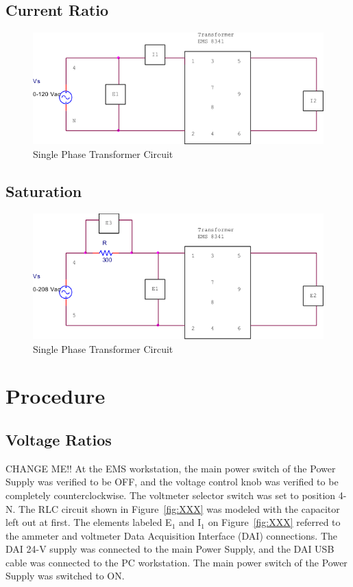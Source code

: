\documentclass{article}
\begin{document}
\subsection{Current Ratio}
\begin{figure}[H]
  \centering
  \includegraphics[width=.8\textwidth]{img/circuit_02}
  \caption{Single Phase Transformer Circuit}
  \label{fig:circuit_02}
\end{figure}

\subsection{Saturation}
\begin{figure}[H]
  \centering
  \includegraphics[width=.8\textwidth]{img/circuit_03}
  \caption{Single Phase Transformer Circuit}
  \label{fig:circuit_03}
\end{figure}

\section{Procedure}
\subsection{Voltage Ratios}
\label{part1}
CHANGE ME!! At the EMS workstation, the main power switch of the Power Supply
was verified to be OFF, and the voltage control knob was verified to be
completely counterclockwise. The voltmeter selector switch was set to position
4-N. The RLC circuit shown in Figure~\ref{fig:XXX} was modeled with the
capacitor left out at first. The elements labeled E$_1$ and I$_1$ on
Figure~\ref{fig:XXX} referred to the ammeter and voltmeter Data Acquisition
Interface (DAI) connections. The DAI 24-V supply was connected to the main
Power Supply, and the DAI USB cable was connected to the PC workstation. The
main power switch of the Power Supply was switched to ON.
\end{document}
